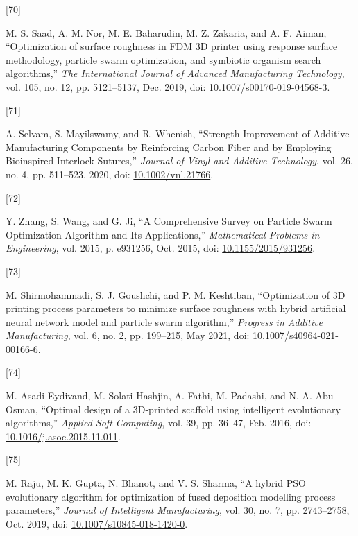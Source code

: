 \documentclass[
]{article}
\newlength{\cslhangindent}
\newlength{\csllabelwidth}
\newlength{\cslentryspacingunit} %
\newenvironment{CSLReferences}[2] %
 {%
  \setlength{\parindent}{0pt}
  \ifodd #1
  \let\oldpar\par
  \def\par{\hangindent=\cslhangindent\oldpar}
  \fi
  \setlength{\parskip}{#2\cslentryspacingunit}
 }%
 {}
\newcommand{\CSLLeftMargin}[1]{\parbox[t]{\csllabelwidth}{#1}}
\newcommand{\CSLRightInline}[1]{\parbox[t]{\linewidth - \csllabelwidth}{#1}\break}
\begin{document}
\begin{CSLReferences}{0}{0}
\leavevmode{}%
\CSLLeftMargin{{[}70{]} }%
\CSLRightInline{M. S. Saad, A. M. Nor, M. E. Baharudin, M. Z. Zakaria,
and A. F. Aiman, {``Optimization of surface roughness in {FDM 3D}
printer using response surface methodology, particle swarm optimization,
and symbiotic organism search algorithms,''} \emph{The International
Journal of Advanced Manufacturing Technology}, vol. 105, no. 12, pp.
5121--5137, Dec. 2019, doi:
\href{https://doi.org/10.1007/s00170-019-04568-3}{10.1007/s00170-019-04568-3}.}

\leavevmode{}%
\CSLLeftMargin{{[}71{]} }%
\CSLRightInline{A. Selvam, S. Mayilswamy, and R. Whenish, {``Strength
{Improvement} of {Additive Manufacturing Components} by {Reinforcing
Carbon Fiber} and by {Employing Bioinspired Interlock Sutures},''}
\emph{Journal of Vinyl and Additive Technology}, vol. 26, no. 4, pp.
511--523, 2020, doi:
\href{https://doi.org/10.1002/vnl.21766}{10.1002/vnl.21766}.}

\leavevmode{}%
\CSLLeftMargin{{[}72{]} }%
\CSLRightInline{Y. Zhang, S. Wang, and G. Ji, {``A {Comprehensive
Survey} on {Particle Swarm Optimization Algorithm} and {Its
Applications},''} \emph{Mathematical Problems in Engineering}, vol.
2015, p. e931256, Oct. 2015, doi:
\href{https://doi.org/10.1155/2015/931256}{10.1155/2015/931256}.}

\leavevmode{}%
\CSLLeftMargin{{[}73{]} }%
\CSLRightInline{M. Shirmohammadi, S. J. Goushchi, and P. M. Keshtiban,
{``Optimization of {3D} printing process parameters to minimize surface
roughness with hybrid artificial neural network model and particle swarm
algorithm,''} \emph{Progress in Additive Manufacturing}, vol. 6, no. 2,
pp. 199--215, May 2021, doi:
\href{https://doi.org/10.1007/s40964-021-00166-6}{10.1007/s40964-021-00166-6}.}

\leavevmode{}%
\CSLLeftMargin{{[}74{]} }%
\CSLRightInline{M. Asadi-Eydivand, M. Solati-Hashjin, A. Fathi, M.
Padashi, and N. A. Abu Osman, {``Optimal design of a {3D-printed}
scaffold using intelligent evolutionary algorithms,''} \emph{Applied
Soft Computing}, vol. 39, pp. 36--47, Feb. 2016, doi:
\href{https://doi.org/10.1016/j.asoc.2015.11.011}{10.1016/j.asoc.2015.11.011}.}

\leavevmode{}%
\CSLLeftMargin{{[}75{]} }%
\CSLRightInline{M. Raju, M. K. Gupta, N. Bhanot, and V. S. Sharma, {``A
hybrid {PSO}\textendash{{BFO}} evolutionary algorithm for optimization
of fused deposition modelling process parameters,''} \emph{Journal of
Intelligent Manufacturing}, vol. 30, no. 7, pp. 2743--2758, Oct. 2019,
doi:
\href{https://doi.org/10.1007/s10845-018-1420-0}{10.1007/s10845-018-1420-0}.}


\end{CSLReferences}
\end{document}

